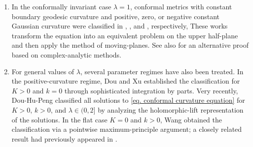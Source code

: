 \documentclass[11pt,a4paper,twoside]{amsart}
\newtheorem{sketch proof}{Sketch of the proof}[section]
\begin{document}
\begin{enumerate}
    \item In the conformally invariant case $\lambda=1$, conformal metrics with constant boundary geodesic curvature and positive, zero, or negative constant Gaussian curvature were classified in
\cite[Theorem 1.3]{LZ95}, 
\cite[Theorem 3.1]{Ou00}, 
and \cite[Theorem 4.3]{Zha03}, respectively, These works transform the equation into an equivalent problem on the upper half-plane and then apply the method of moving-planes. See also \cite{HW06} for an alternative proof based on complex-analytic methods.
\\

\item For general values of $\lambda$, several parameter regimes have also been treated.
In the positive-curvature regime, Dou and Xu \cite[Theorem~1.1]{Dou-Xu} established the classification for $K>0$ and $k=0$ through sophisticated integration by parts. Very recently, Dou-Hu-Peng \cite[Theorems 1.1 and 1.3]{DHP26} classified all solutions to \cref{eq. conformal curvature equation} for $K>0$, $k>0$, and $\lambda\in(0,2]$  by analyzing the holomorphic-lift representation of the solutions.
In the flat case $K=0$ and $k>0$, Wang \cite[Theorem~2]{Wang2017} obtained the classification via a pointwise maximum-principle argument; a closely related result had previously appeared in \cite{Osgood88}.
\end{enumerate}
\end{document}
